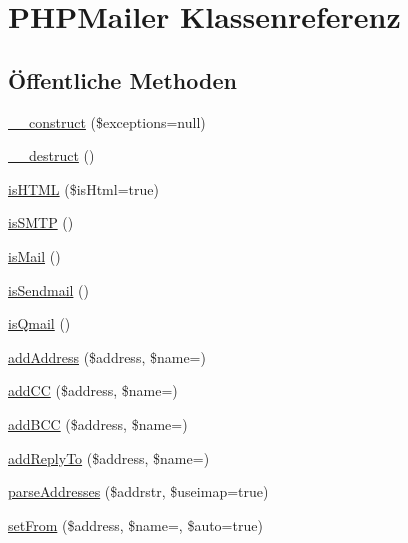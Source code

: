 \hypertarget{class_p_h_p_mailer}{}\section{P\+H\+P\+Mailer Klassenreferenz}
\label{class_p_h_p_mailer}
\subsection*{Öffentliche Methoden}
\begin{DoxyCompactItemize}
\item 
\mbox{\hyperlink{class_p_h_p_mailer_a0ecb02fb405337bb4d66e56d3651b30f}{\+\_\+\+\_\+construct}} (\$exceptions=null)
\item 
\mbox{\hyperlink{class_p_h_p_mailer_aab0f23b3b419bfa0090281530e926a56}{\+\_\+\+\_\+destruct}} ()
\item 
\mbox{\hyperlink{class_p_h_p_mailer_aaa2f1d7b49eb316e3567773c01770377}{is\+H\+T\+ML}} (\$is\+Html=true)
\item 
\mbox{\hyperlink{class_p_h_p_mailer_aa94bd392205c9a523671d39fb1f6e079}{is\+S\+M\+TP}} ()
\item 
\mbox{\hyperlink{class_p_h_p_mailer_a5fb69456c3abfbe88d9a19e7374c6910}{is\+Mail}} ()
\item 
\mbox{\hyperlink{class_p_h_p_mailer_a00833d08b354d38513df87393d79b6c3}{is\+Sendmail}} ()
\item 
\mbox{\hyperlink{class_p_h_p_mailer_aa34f0d6e401e7f07a68777c3d8f686ed}{is\+Qmail}} ()
\item 
\mbox{\hyperlink{class_p_h_p_mailer_a710206c4b4c43b43f352fb8e139cd0da}{add\+Address}} (\$address, \$name=\textquotesingle{}\textquotesingle{})
\item 
\mbox{\hyperlink{class_p_h_p_mailer_a46b29687c4f82d20e947f94b908116e2}{add\+CC}} (\$address, \$name=\textquotesingle{}\textquotesingle{})
\item 
\mbox{\hyperlink{class_p_h_p_mailer_af89ff133bac97eeed5c17bb8018e89db}{add\+B\+CC}} (\$address, \$name=\textquotesingle{}\textquotesingle{})
\item 
\mbox{\hyperlink{class_p_h_p_mailer_a2cd3a4cf1456a55d8cd181e3605a6785}{add\+Reply\+To}} (\$address, \$name=\textquotesingle{}\textquotesingle{})
\item 
\mbox{\hyperlink{class_p_h_p_mailer_a93d0d1b3b732b2a6b1bab5fe1a90c59a}{parse\+Addresses}} (\$addrstr, \$useimap=true)
\item 
\mbox{\hyperlink{class_p_h_p_mailer_a30d3ec8466c08ecbd3b21be2610bc369}{set\+From}} (\$address, \$name=\textquotesingle{}\textquotesingle{}, \$auto=true)

\end{DoxyCompactItemize}
